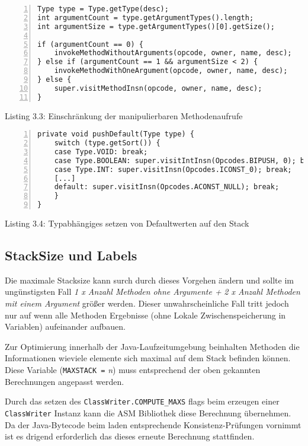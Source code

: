 \begin{lstlisting}[basicstyle=\ttfamily,numbers=left,numberstyle=\footnotesize\ttfamily,backgroundcolor=\color{source}]
Type type = Type.getType(desc);
int argumentCount = type.getArgumentTypes().length;
int argumentSize = type.getArgumentTypes()[0].getSize();

if (argumentCount == 0) {
	invokeMethodWithoutArguments(opcode, owner, name, desc);
} else if (argumentCount == 1 && argumentSize < 2) {
	invokeMethodWithOneArgument(opcode, owner, name, desc);
} else {
	super.visitMethodInsn(opcode, owner, name, desc);
}
\end{lstlisting}
\centerline{Listing 3.3: Einschränkung der manipulierbaren Methodenaufrufe}

\vspace{0.3cm}


\begin{lstlisting}[basicstyle=\ttfamily,numbers=left,numberstyle=\footnotesize\ttfamily,backgroundcolor=\color{source}]
private void pushDefault(Type type) {
	switch (type.getSort()) {
	case Type.VOID: break;
	case Type.BOOLEAN: super.visitIntInsn(Opcodes.BIPUSH, 0); break;
	case Type.INT: super.visitInsn(Opcodes.ICONST_0); break;
	[...]
	default: super.visitInsn(Opcodes.ACONST_NULL); break;
	}
}
\end{lstlisting}
\centerline{Listing 3.4: Typabhängiges setzen von Defaultwerten auf den Stack}

\vspace{0.3cm}


\subsection{StackSize und Labels}

Die maximale Stacksize kann surch durch dieses Vorgehen ändern und sollte
im ungünstigsten Fall \emph{1 x Anzahl Methoden ohne Argumente +}
\emph{2 x Anzahl Methoden mit einem Argument} größer werden.
Dieser unwahrscheinliche Fall tritt jedoch nur auf wenn alle Methoden
Ergebnisse (ohne Lokale Zwischenspeicherung in Variablen) aufeinander aufbauen.

Zur Optimierung innerhalb der Java-Laufzeitumgebung beinhalten Methoden
die Informationen wieviele elemente sich maximal auf dem Stack befinden können.
Diese Variable (\texttt{MAXSTACK =} \emph{n}) muss entsprechend der oben
gekannten Berechnungen angepasst werden.

Durch das setzen des \texttt{ClassWriter.COMPUTE\_MAXS} flags beim erzeugen
einer \texttt{ClassWriter} Instanz kann die ASM Bibliothek diese Berechnung
übernehmen. Da der Java-Bytecode beim laden entsprechende Konsistenz-Prüfungen 
vornimmt ist es drigend erforderlich das dieses erneute Berechnung stattfinden.


